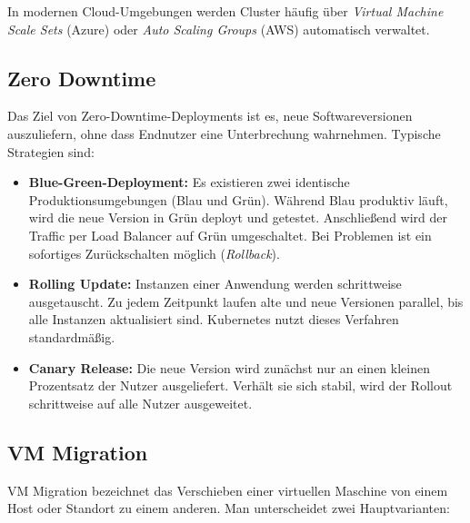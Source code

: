 In modernen Cloud-Umgebungen werden Cluster häufig über
\textit{Virtual Machine Scale Sets} (Azure) oder
\textit{Auto Scaling Groups} (AWS) automatisch verwaltet.

\subsection{Zero Downtime}
Das Ziel von Zero-Downtime-Deployments ist es, neue Softwareversionen
auszuliefern, ohne dass Endnutzer eine Unterbrechung wahrnehmen. Typische
Strategien sind:

\begin{itemize}
    \item \textbf{Blue-Green-Deployment:} Es existieren zwei identische
    Produktionsumgebungen (Blau und Grün). Während Blau produktiv läuft, wird
    die neue Version in Grün deployt und getestet. Anschließend wird der
    Traffic per Load Balancer auf Grün umgeschaltet. Bei Problemen ist ein
    sofortiges Zurückschalten möglich (\textit{Rollback}).

    \item \textbf{Rolling Update:} Instanzen einer Anwendung werden
    schrittweise ausgetauscht. Zu jedem Zeitpunkt laufen alte und neue
    Versionen parallel, bis alle Instanzen aktualisiert sind. Kubernetes nutzt
    dieses Verfahren standardmäßig.

    \item \textbf{Canary Release:} Die neue Version wird zunächst nur an einen
    kleinen Prozentsatz der Nutzer ausgeliefert. Verhält sie sich stabil, wird
    der Rollout schrittweise auf alle Nutzer ausgeweitet.
\end{itemize}


\subsection{VM Migration}
VM Migration bezeichnet das Verschieben einer virtuellen Maschine von einem
Host oder Standort zu einem anderen. Man unterscheidet zwei Hauptvarianten:

